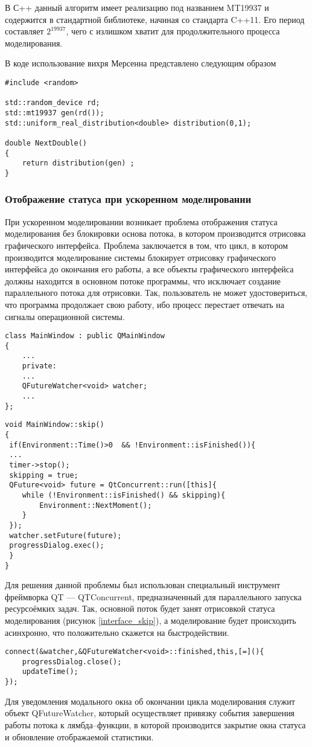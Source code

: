 В С++ данный алгоритм имеет реализацию под названием MT19937 и содержится в стандартной библиотеке, начиная со стандарта C++11. Его период составляет $2^{19937}$, чего с излишком хватит для продолжительного процесса моделирования. 

В коде использование вихря Мерсенна представлено следующим образом
\begin{lstlisting}
#include <random>

std::random_device rd;
std::mt19937 gen(rd());
std::uniform_real_distribution<double> distribution(0,1);

double NextDouble()
{
	return distribution(gen) ;
}
\end{lstlisting}

\subsubsection{Отображение статуса при ускоренном моделировании}
При ускоренном моделировании возникает проблема отображения статуса моделирования без блокировки основа потока, в котором производится отрисовка графического интерфейса. Проблема заключается в том, что цикл, в котором производится моделирование системы блокирует отрисовку графического интерфейса до окончания его работы, а все объекты графического интерфейса должны находится в основном потоке программы, что исключает создание параллельного потока для отрисовки. Так, пользователь не может удостовериться, что программа продолжает свою работу, ибо процесс перестает отвечать на сигналы операционной системы.
\begin{lstlisting}
class MainWindow : public QMainWindow
{
	...
	private:
	...
	QFutureWatcher<void> watcher;
	...
};
\end{lstlisting}
\begin{lstlisting}
void MainWindow::skip()
{
 if(Environment::Time()>0  && !Environment::isFinished()){
 ...
 timer->stop();
 skipping = true;
 QFuture<void> future = QtConcurrent::run([this]{
	while (!Environment::isFinished() && skipping){
		Environment::NextMoment();
	}
 });
 watcher.setFuture(future);
 progressDialog.exec();
 }
}
\end{lstlisting}

Для решения данной проблемы был использован специальный инструмент фреймворка QT --- QTConcurrent, предназначенный для параллельного запуска ресурсоёмких задач. Так, основной поток будет занят отрисовкой статуса моделирования (рисунок \ref{interface_skip}), а моделирование будет происходить асинхронно, что положительно скажется на быстродействии.
\begin{lstlisting}
connect(&watcher,&QFutureWatcher<void>::finished,this,[=](){
	progressDialog.close();
	updateTime();
});
\end{lstlisting}
Для уведомления модального окна об окончании цикла моделирования служит объект QFutureWatcher, который осуществляет привязку события завершения работы потока к лямбда--функции, в которой производится закрытие окна статуса и обновление отображаемой статистики.
\clearpage